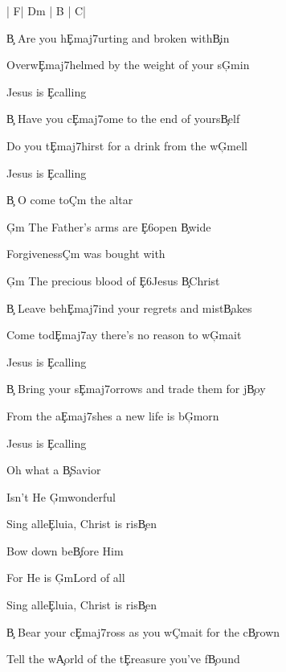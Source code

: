 \documentclass[9pt]{extarticle}
\begin{document}
\bsong

\bi
| F\s  | D\s m | B | C\s  |
\ei

\bv
\c{B} Are you h\c{Emaj7}urting and broken with\c{B}in

Overw\c{Emaj7}helmed by the weight of your s\c{G\s m}in

Jesus is \c{E}calling

\c{B} Have you c\c{Emaj7}ome to the end of yours\c{B}elf

Do you t\c{Emaj7}hirst for a drink from the w\c{G\s m}ell

Jesus is \c{E}calling
\ev

\bc
\c{B} O come to\c{C\s m} the altar

\c{G\s m} The Father's arms are \c{E6}open \c{B}wide

Forgiveness\c{C\s m} was bought with

\c{G\s m} The precious blood of \c{E6}Jesus \c{B}Christ
\ec

\bv
\c{B} Leave beh\c{Emaj7}ind your regrets and mist\c{B}akes

Come tod\c{Emaj7}ay there's no reason to w\c{G\s m}ait

Jesus is \c{E}calling

\c{B} Bring your s\c{Emaj7}orrows and trade them for j\c{B}oy

From the a\c{Emaj7}shes a new life is b\c{G\s m}orn

Jesus is \c{E}calling
\ev


\bb[2]
Oh what a \c{B}Savior

Isn't He \c{G\s m}wonderful

Sing alle\c{E}luia, Christ is ris\c{B}en

Bow down be\c{B}fore Him

For He is \c{G\s m}Lord of all

Sing alle\c{E}luia, Christ is ris\c{B}en
\eb


\bo
\c{B} Bear your c\c{Emaj7}ross as you w\c{C\s m}ait for the c\c{B}rown

Tell the w\c{A}orld of the t\c{E}reasure you've f\c{B}ound
\eo

\esong
\end{document}
